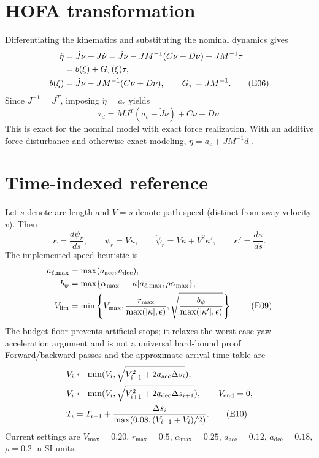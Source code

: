 \documentclass[11pt,a4paper]{article}
\begin{document}
\section{HOFA transformation}
Differentiating the kinematics and substituting the nominal dynamics gives
\begin{align}
\ddot\eta&=\dot J\nu+J\dot\nu
=\dot J\nu-JM^{-1}(C\nu+D\nu)+JM^{-1}\tau\notag\\
&=b(\xi)+G_\tau(\xi)\tau,\notag\\
b(\xi)&=\dot J\nu-JM^{-1}(C\nu+D\nu),\qquad G_\tau=JM^{-1}.
\tag{E06}
\end{align}
Since $J^{-1}=J^T$, imposing $\ddot\eta=a_c$ yields
\begin{equation}
\boxed{\tau_d=MJ^T(a_c-\dot J\nu)+C\nu+D\nu.}\tag{E07}
\end{equation}
This is exact for the nominal model with exact force realization. With an
additive force disturbance and otherwise exact modeling,
$\ddot\eta=a_c+JM^{-1}d_\tau$.

\section{Time-indexed reference}
Let $s$ denote arc length and $V=\dot s$ denote path speed (distinct from sway
velocity $v$). Then
\begin{equation}
\kappa=\frac{d\psi_r}{ds},\qquad \dot\psi_r=V\kappa,\qquad
\ddot\psi_r=\dot V\kappa+V^2\kappa',\qquad \kappa'=\frac{d\kappa}{ds}.
\tag{E08}
\end{equation}
The implemented speed heuristic is
\begin{align}
a_{\ell,\max}&=\max(a_{\mathrm{acc}},a_{\mathrm{dec}}),\notag\\
b_\psi&=\max\{\alpha_{\max}-|\kappa|a_{\ell,\max},\rho\alpha_{\max}\},\notag\\
V_{\lim}&=\min\left\{V_{\max},\frac{r_{\max}}{\max(|\kappa|,\epsilon)},
\sqrt{\frac{b_\psi}{\max(|\kappa'|,\epsilon)}}\right\}.\tag{E09}
\end{align}
The budget floor prevents artificial stops; it relaxes the worst-case yaw
acceleration argument and is not a universal hard-bound proof.
Forward/backward passes and the approximate arrival-time table are
\begin{align}
V_i&\leftarrow\min(V_i,\sqrt{V_{i-1}^2+2a_{\mathrm{acc}}\Delta s_i}),\notag\\
V_i&\leftarrow\min(V_i,\sqrt{V_{i+1}^2+2a_{\mathrm{dec}}\Delta s_{i+1}}),
\qquad V_{\mathrm{end}}=0,\notag\\
T_i&=T_{i-1}+\frac{\Delta s_i}{\max(0.08,(V_{i-1}+V_i)/2)}.\tag{E10}
\end{align}
Current settings are $V_{\max}=0.20$, $r_{\max}=0.5$, $\alpha_{\max}=0.25$,
$a_{\mathrm{acc}}=0.12$, $a_{\mathrm{dec}}=0.18$, $\rho=0.2$ in SI units.
\end{document}
